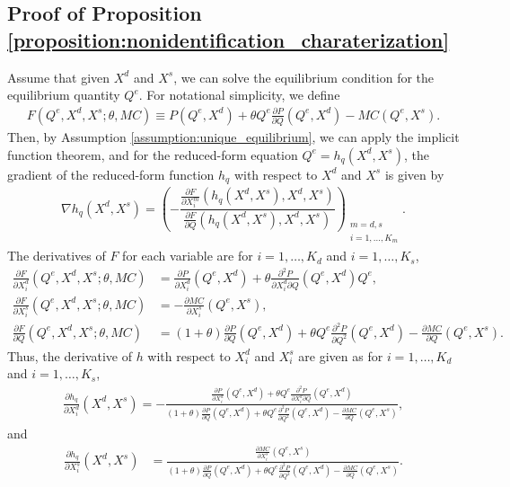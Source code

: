 \documentclass[11pt, a4paper]{article}
\theoremstyle{remark}
\begin{document}
\subsection{Proof of Proposition \ref{proposition:nonidentification_charaterization}}
Assume that given $X^{d}$ and $X^{s}$, we can solve the equilibrium condition for the equilibrium quantity $Q^e$.
For notational simplicity, we define
\begin{align}
    F(Q^e, X^{d}, X^{s}; \theta, MC) \equiv P(Q^e, X^{d}) + \theta Q^e\frac{\partial P}{\partial Q}(Q^e, X^{d}) - MC(Q^e, X^{s}).
\end{align}
Then, by Assumption \ref{assumption:unique_equilibrium}, we can apply the implicit function theorem, and for the reduced-form equation $Q^e = h_q(X^{d}, X^{s})$, the gradient of the reduced-form function $h_q$ with respect to $X^{d}$ and $X^{s}$ is given by
\begin{align}
    \nabla h_q(X^{d}, X^{s}) =  \left( -\dfrac{\frac{\partial F}{\partial X^{m}_{i}}(h_q(X^{d}, X^{s}), X^{d}, X^{s})}{\frac{\partial F}{\partial Q}(h_q(X^{d}, X^{s}), X^{d}, X^{s})} \right)_{\substack{m = d, s\\ i = 1, \ldots, K_m}}. \label{eq:foc_derivative_demand_supply}
\end{align}
The derivatives of $F$ for each variable are for $i = 1, \ldots, K_d$ and $i = 1, \ldots, K_s$,
\begin{align}
    \frac{\partial F}{\partial X^{d}_i}(Q^e, X^{d}, X^{s}; \theta, MC) & =  \frac{\partial P}{\partial X^{d}_{i}}(Q^e, X^{d}) + \theta\frac{\partial^2 P}{\partial X^{d}_{i}\partial Q}(Q^e, X^{d})Q^e,\\
    \frac{\partial F}{\partial X^{s}_i}(Q^e, X^{d}, X^{s}; \theta, MC) & =  -\frac{\partial MC}{\partial X^{s}_{i}}(Q^e, X^{s}), \\
    \frac{\partial F}{\partial Q}(Q^e, X^{d}, X^{s}; \theta, MC) & = (1+\theta)\frac{\partial P}{\partial Q}(Q^e, X^{d}) + \theta Q^e\frac{\partial^2 P}{\partial Q^2}(Q^e, X^{d}) - \frac{\partial MC}{\partial Q}(Q^e, X^{s}).
\end{align}
Thus, the derivative of $h$ with respect to $X^{d}_i$ and $X^{s}_i$ are given as for $i = 1, \ldots, K_d$ and $i = 1, \ldots, K_s$,
\begin{align}
    \frac{\partial h_q}{\partial X^{d}_{i}}(X^{d}, X^{s}) = -\frac{\frac{\partial P}{\partial X^{d}_{i}}(Q^e, X^{d}) + \theta Q^e \frac{\partial^2 P}{\partial X^{d}_{i}\partial Q}(Q^e, X^{d}) }{(1+\theta)\frac{\partial P}{\partial Q}(Q^e, X^{d}) + \theta  Q^e\frac{\partial^2 P}{\partial Q^2}(Q^e, X^{d}) - \frac{\partial MC}{\partial Q}(Q^e, X^{s})}, \label{eq:foc_derivative_demand}
\end{align}
and
\begin{align}
    \frac{\partial h_q}{\partial X^{s}_{i}}(X^{d}, X^{s}) & = \frac{\frac{\partial MC}{\partial X^{s}_{i}}(Q^e, X^{s})}{(1+\theta)\frac{\partial P}{\partial Q}(Q^e, X^{d}) + \theta  Q^e\frac{\partial^2 P}{\partial Q^2}(Q^e, X^{d}) - \frac{\partial MC}{\partial Q}(Q^e, X^{s})}. \label{eq:foc_derivative_supply}
\end{align}
\end{document}
